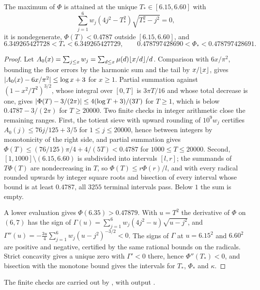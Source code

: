\begin{lemma}\label{src:lem:grammax}
The maximum of $\Phi$ is attained at the unique $T_*\in[6.15,6.60]$ with
\begin{equation}\label{src:eq:gramroot}
 \sum_{j=1}^6w_j(4j^2-T_*^2)\sqrt{T_*^2-j^2}=0 ,
\end{equation}
it is nondegenerate, $\Phi(T)<0.4787$ outside $[6.15,6.60]$, and
\[
 6.349265427728<T_*<6.349265427729,\qquad0.478797428690<\Phi_*<0.478797428691 .
\]
\end{lemma}

\begin{proof}
Let $A_0(x)=\sum_{j\le x}w_j=\sum_{d\le x}\mu(d)\lfloor x/d\rfloor/d$. Comparison with $6x/\pi^2$, bounding the
floor errors by the harmonic sum and the tail by $x/\lfloor x\rfloor$, gives $\lvert A_0(x)-6x/\pi^2\rvert\le\log x+3$
for $x\ge1$. Partial summation against $(1-x^2/T^2)^{3/2}$, whose integral over $[0,T]$ is $3\pi T/16$ and
whose total decrease is one, gives
$\lvert\Phi(T)-3/(2\pi)\rvert\le4(\log T+3)/(3T)$ for $T\ge1$, which is below $0.4787-3/(2\pi)$ for $T\ge20000$.
Two finite checks in integer arithmetic close the remaining ranges. First, the totient sieve with upward
rounding of $10^9w_j$ certifies $A_0(j)\le76j/125+3/5$ for $1\le j\le20000$, hence between integers by
monotonicity of the right side, and partial summation gives
$\Phi(T)\le(76/125)\pi/4+4/(5T)<0.4787$ for $1000\le T\le20000$. Second, $[1,1000]\setminus(6.15,6.60)$ is
subdivided into intervals $[l,r]$; the summands of $T\Phi(T)$ are nondecreasing in $T$, so
$\Phi(T)\le r\Phi(r)/l$, and with every radical rounded upwards by integer square roots and bisection of
every interval whose bound is at least $0.4787$, all $3255$ terminal intervals pass. Below $1$ the sum is
empty.

A lower evaluation gives $\Phi(6.35)>0.47879$. With $u=T^2$ the derivative of $\Phi$ on $(6,7)$ has the sign
of $\Gamma(u)=\sum_{j=1}^6w_j(4j^2-u)\sqrt{u-j^2}$, and
$\Gamma''(u)=-\frac{3u}4\sum_{j=1}^6w_j(u-j^2)^{-3/2}<0$. The signs of $\Gamma$ at $u=6.15^2$ and $6.60^2$ are
positive and negative, certified by the same rational bounds on the radicals. Strict concavity gives a
unique zero with $\Gamma'<0$ there, hence $\Phi''(T_*)<0$, and bisection with the monotone bound gives the
intervals for $T_*$, $\Phi_*$ and $\kappa$.
\end{proof}

{\raggedright The finite checks are carried out by
, with output
.\par}

